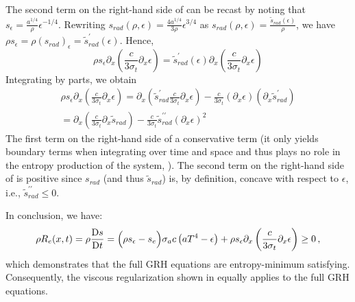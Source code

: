 \documentclass[times]{fldauth}
\begin{document}
The second term on the right-hand side of  can be recast by noting that $s_\epsilon = 
\frac{a^{1/4}}{\rho} \epsilon^{-1/4}$. Rewriting $s_{rad}(\rho, \epsilon) = \frac{4a^{1/4}}{3\rho} \epsilon^{3/4}$ 
as  $s_{rad}(\rho, \epsilon) = \frac{\tilde{s}_{rad}(\epsilon)}{\rho}$, we have
$ \rho s_\epsilon = \rho (s_{rad})_\epsilon = \tilde{s}^\prime_{rad}(\epsilon)$. Hence, 
\begin{equation}
\rho s_\epsilon \partial_x \left( \frac{c}{3 \sigma_t} \partial_x \epsilon \right) 
=
 \tilde{s}^\prime_{rad}(\epsilon) \partial_x \left( \frac{c}{3 \sigma_t} \partial_x \epsilon \right) 
\end{equation}
%
Integrating by parts, we obtain
%
\begin{multline} \label{eq:final_form_second_term}
\rho s_\epsilon \partial_x \left( \frac{c}{3 \sigma_t} \partial_x \epsilon \right) 
=
 \partial_x \left(  \tilde{s}^\prime_{rad}  \frac{c}{3 \sigma_t} \partial_x \epsilon \right) 
-
\frac{c}{3 \sigma_t} \left(  \partial_x \epsilon \right)  \left( \partial_x \tilde{s}^\prime_{rad}  \right) \\
=
 \partial_x \left(   \frac{c}{3 \sigma_t} \partial_x \tilde{s}_{rad}  \right) 
-
\frac{c}{3 \sigma_t} \tilde{s}^{\prime\prime}_{rad}  \left(  \partial_x \epsilon \right)^2   \qquad  \qquad  \qquad \ 
\end{multline}
%
The first term on the right-hand side of  a conservative term (it only yields boundary 
terms when integrating over time and space and thus plays no role in the entropy production of the system, 
\cite{Leveque}). The second term on the right-hand side of \eqt{eq:final_form_second_term} is positive 
since $s_{rad}$ (and thus $\tilde{s}_{rad}$) is, by definition, concave with respect to $\epsilon$, i.e., $\tilde{s}^{\prime\prime}_{rad} \leq 0$.

In conclusion, we have: 
\begin{equation} 
\rho R_e(x,t) = \rho \frac{\textrm{D} s}{\textrm{D} t} = \Big( \rho s_\epsilon -s_e \Big)  \sigma_a c \left( a T^4 - \epsilon \right) +   \rho s_\epsilon \partial_x \left( \frac{c}{3 \sigma_t} \partial_x \epsilon \right) \geq 0 \,,
\end{equation}
which demonstrates that the full GRH equations are entropy-minimum satisfying. Consequently, the viscous regularization shown in  equally applies to the full GRH equations. 
%
\end{document}
